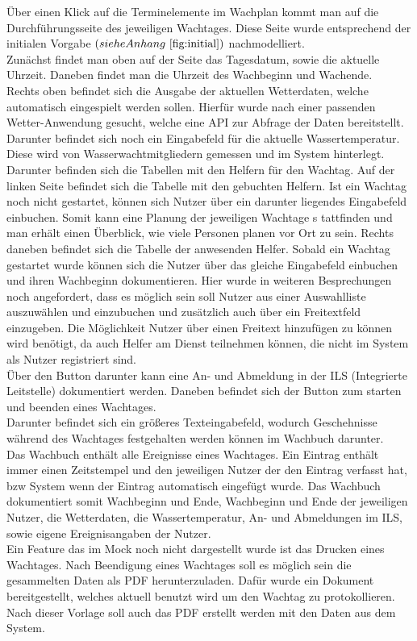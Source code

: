 \documentclass[fontsize=12pt,openright,oneside,paper=a4,BCOR=1cm]{scrbook}
\begin{document}
Über einen Klick auf die Terminelemente im Wachplan kommt man auf die Durchführungsseite des jeweiligen Wachtages. Diese Seite wurde entsprechend der initialen Vorgabe $(siehe Anhang ~\ref{fig:initial})$ nachmodelliert. \\
Zunächst findet man oben auf der Seite das Tagesdatum, sowie die aktuelle Uhrzeit. Daneben findet man die Uhrzeit des Wachbeginn und Wachende. \\
Rechts oben befindet sich die Ausgabe der aktuellen Wetterdaten, welche automatisch eingespielt werden sollen. Hierfür wurde nach einer passenden Wetter-Anwendung gesucht, welche eine API zur Abfrage der Daten bereitstellt. Darunter befindet sich noch ein Eingabefeld für die aktuelle Wassertemperatur. Diese wird von Wasserwachtmitgliedern gemessen und im System hinterlegt. \\ 
Darunter befinden sich die Tabellen mit den Helfern für den Wachtag. Auf der linken Seite befindet sich die Tabelle mit den gebuchten Helfern. Ist ein Wachtag noch nicht gestartet, können sich Nutzer über ein darunter liegendes Eingabefeld einbuchen. Somit kann eine Planung der jeweiligen Wachtage s
tattfinden und man erhält einen Überblick, wie viele Personen planen vor Ort zu sein. Rechts daneben befindet sich die Tabelle der anwesenden Helfer. Sobald ein Wachtag gestartet wurde können sich die Nutzer über das gleiche Eingabefeld einbuchen und ihren Wachbeginn dokumentieren. Hier wurde in weiteren Besprechungen noch angefordert, dass es möglich sein soll Nutzer aus einer Auswahlliste auszuwählen und einzubuchen und zusätzlich auch über ein Freitextfeld einzugeben. Die Möglichkeit Nutzer über einen Freitext hinzufügen zu können wird benötigt, da auch Helfer am Dienst teilnehmen können, die nicht im System als Nutzer registriert sind. \\
Über den Button darunter kann eine An- und Abmeldung in der ILS (Integrierte Leitstelle) dokumentiert werden. Daneben befindet sich der Button zum starten und beenden eines Wachtages.\\
Darunter befindet sich ein größeres Texteingabefeld, wodurch Geschehnisse während des Wachtages festgehalten werden können im Wachbuch darunter. \\
Das Wachbuch enthält alle Ereignisse eines Wachtages. Ein Eintrag enthält immer einen Zeitstempel und den jeweiligen Nutzer der den Eintrag verfasst hat, bzw \glqq System\grqq{} wenn der Eintrag automatisch eingefügt wurde. Das Wachbuch dokumentiert somit Wachbeginn und Ende, Wachbeginn und Ende der jeweiligen Nutzer, die Wetterdaten, die Wassertemperatur, An- und Abmeldungen im ILS, sowie eigene Ereignisangaben der Nutzer.\\
Ein Feature das im Mock noch nicht dargestellt wurde ist das Drucken eines Wachtages. Nach Beendigung eines Wachtages soll es möglich sein die gesammelten Daten als PDF herunterzuladen. Dafür wurde ein Dokument bereitgestellt, welches aktuell benutzt wird um den Wachtag zu protokollieren. Nach dieser Vorlage soll auch das PDF erstellt werden mit den Daten aus dem System.
\end{document}
